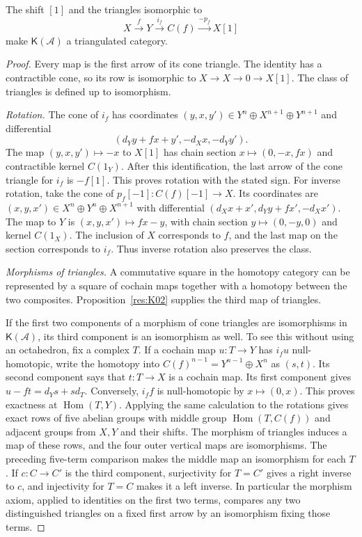 \begin{theorem}
\label{res:K05}
The shift \([1]\) and the triangles isomorphic to
\[
 X\xrightarrow{f}Y\xrightarrow{i_f}C(f)
     \xrightarrow{-p_f}X[1]
\]
make \(\mathsf K(\mathcal A)\) a triangulated category.
\end{theorem}
\begin{proof}
Every map is the first arrow of its cone triangle. The identity has a
contractible cone, so its row is isomorphic to \(X\to X\to0\to X[1]\).
The class of triangles is defined up to isomorphism.

\emph{Rotation.} The cone of \(i_f\) has coordinates
\((y,x,y')\in Y^n\oplus X^{n+1}\oplus Y^{n+1}\) and differential
\[
 (d_Yy+fx+y',-d_Xx,-d_Yy').
\]
The map \((y,x,y')\mapsto-x\) to \(X[1]\) has chain section
\(x\mapsto(0,-x,fx)\) and contractible kernel \(C(1_Y)\). After this
identification, the last arrow of the cone triangle for \(i_f\) is
\(-f[1]\). This proves rotation with the stated sign. For inverse
rotation, take the cone of \(p_f[-1]:C(f)[-1]\to X\). Its coordinates
are \((x,y,x')\in X^n\oplus Y^n\oplus X^{n+1}\) with differential
\((d_Xx+x',d_Yy+fx',-d_Xx')\). The map to \(Y\) is
\((x,y,x')\mapsto fx-y\), with chain section \(y\mapsto(0,-y,0)\)
and kernel \(C(1_X)\). The inclusion of \(X\) corresponds to \(f\),
and the last map on the section corresponds to \(i_f\). Thus inverse
rotation also preserves the class.

\emph{Morphisms of triangles.} A commutative square in the homotopy
category can be represented by a square of cochain maps together with
a homotopy between the two composites. Proposition~\ref{res:K02}
supplies the third map of triangles.

If the first two components of a morphism of cone triangles are
isomorphisms in \(\mathsf K(\mathcal A)\), its third component is an
isomorphism as well. To see this without using an octahedron, fix a
complex \(T\). If a cochain map \(u:T\to Y\) has \(i_fu\) null-homotopic,
write the homotopy into \(C(f)^{n-1}=Y^{n-1}\oplus X^n\) as \((s,t)\).
Its second component says that \(t:T\to X\) is a cochain map. Its
first component gives \(u-ft=d_Ys+s d_T\). Conversely, \(i_ff\)
is null-homotopic by \(x\mapsto(0,x)\). This proves exactness at
\(\operatorname{Hom}(T,Y)\). Applying the same calculation to the
rotations gives exact rows of five abelian groups with middle group
\(\operatorname{Hom}(T,C(f))\) and adjacent groups from \(X,Y\) and
their shifts. The morphism of triangles induces a map of these rows,
and the four outer vertical maps are isomorphisms. The preceding
five-term comparison makes the middle map an isomorphism for each \(T\). If \(c:C\to C'\)
is the third component, surjectivity for \(T=C'\) gives a right
inverse to \(c\), and injectivity for \(T=C\) makes it a left
inverse. In particular the morphism axiom, applied to identities
on the first two terms, compares any two distinguished triangles
on a fixed first arrow by an isomorphism fixing those terms.


\end{proof}
